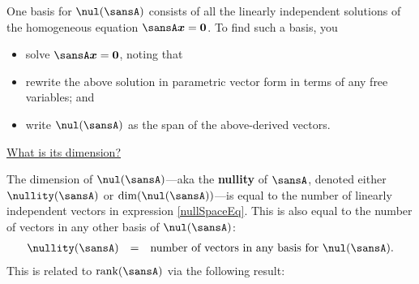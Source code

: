 \documentclass[12 pt]{article}
\begin{document}
One basis for $\nul(\sansA)$ consists of all the linearly independent solutions of the homogeneous equation $\sansA\vect{x}=\vect{0}$. To find such a basis, you 

\begin{itemize}
	\item solve $\sansA\vect{x}=\vect{0}$, noting that
	
	
	\item rewrite the above solution in parametric vector form in terms of any free variables; and
	
	\item write $\nul(\sansA)$ as the span of the above-derived vectors.
\end{itemize}

\vspace{6mm}

\noindent\ul{What is its dimension?}

The dimension of $\nul(\sansA)$---aka the \textbf{nullity} of $\sansA$, denoted either $\nullity(\sansA)$ or $\dim(\nul(\sansA))$---is equal to the number of linearly independent vectors in expression \eqref{nullSpaceEq}. This is also equal to the number of vectors in any other basis of $\nul(\sansA)$:
\[
	\begin{array}{rcl}
	\nullity(\sansA) & = & \text{number of vectors in any basis for $\nul(\sansA)$}.
	\end{array}
\]
This is related to $\rank(\sansA)$ via the following result:

\vspace{3mm}


\vspace{3mm}
\end{document}

